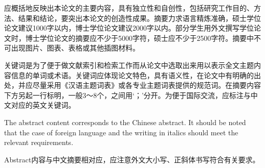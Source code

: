 \begin{cabstract}
应概括地反映出本论文的主要内容，具有独立性和自创性，包括研究工作目的、方法、结果和结论，要突出本论文的创造性成果。摘要力求语言精炼准确，硕士学位论文建议1000字以内，博士学位论文建议2000字以内。部分学生用外文撰写学位论文时，博士学位论文的摘要应不少于5000字符，硕士应不少于2500字符。摘要中不可出现图片、图表、表格或其他插图材料。

关键词是为了便于做文献索引和检索工作而从论文中选取出来用以表示全文主题内容信息的单词或术语。关键词应体现论文特色，具有语义性，在论文中有明确的出处，并应尽量采用《汉语主题词表》或各专业主题词表提供的规范词。在摘要内容下方另起一行标明，一般3～8个，之间用‘；’分开。为便于国际交流，应标注与中文对应的英文关键词。
\end{cabstract}
\begin{eabstract} 
The abstract content corresponds to the Chinese abstract. It should be noted that the case of foreign language and the writing in italics should meet the relevant requirements.

Abstract内容与中文摘要相对应，应注意外文大小写、正斜体书写符合有关要求。
\end{eabstract}

